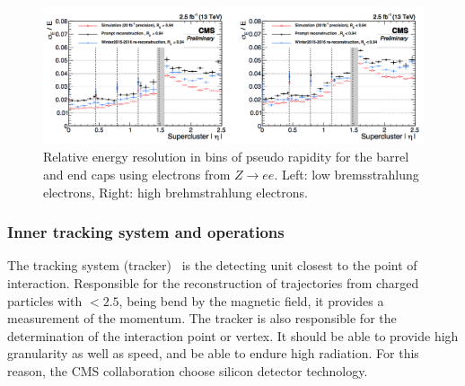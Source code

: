 \begin{figure}[ht]
	\centering
	\includegraphics[width=\textwidth]{2_ExperimentalSetup/Figures/imageedit_7_5931623976}
	\caption{Relative energy resolution in bins of pseudo rapidity for the barrel and end caps using electrons from $Z \rightarrow ee$. Left: low bremsstrahlung electrons, Right: high brehmstrahlung electrons\cite{Sun:2233637}.}
	\label{fig:ECALres}
\end{figure}


\subsubsection{Inner tracking system and operations}
The tracking system (tracker)~\cite{Chatrchyan:1704291} is the detecting unit closest to the point of interaction. Responsible for the reconstruction of  trajectories from charged particles with \abspsrap $<2.5$, being bend by the magnetic field, it provides a measurement of the momentum. The tracker is also responsible for the determination of the interaction point or vertex. It should be able to provide high granularity as well as speed, and be able to endure high radiation. For this reason, the CMS collaboration choose silicon detector technology.

